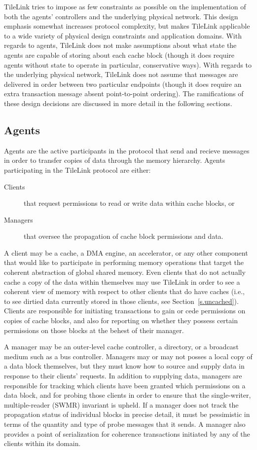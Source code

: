 TileLink tries to impose as few constraints as possible on the implementation of both the agents' controllers and the underlying physical network.
This design emphasis somewhat increases protocol complexity, but makes TileLink applicable to a wide variety of physical design constraints and application domains.
With regards to agents, TileLink does not make assumptions about what state the agents are capable of storing about each cache block
(though it does require agents without state to operate in particular, conservative ways).
With regards to the underlying physical network, TileLink does not assume that messages are delivered in order between two particular endpoints
(though it does require an extra transaction message absent point-to-point ordering).
The ramifications of these design decisions are discussed in more detail in the following sections.

\subsection{Agents}

Agents are the active participants in the protocol that send and recieve messages in order to transfer copies of data through the memory hierarchy.
Agents participating in the TileLink protocol are either:
\begin{description}
\item[Clients] that request permissions to read or write data within cache blocks, or
\item[Managers] that oversee the propagation of cache block permissions and data.
\end{description}

A client may be a cache, a DMA engine, an accelerator, or any other component that would like to participate in performing memory operations that target the coherent abstraction of global shared memory.
Even clients that do not actually cache a copy of the data within themselves may use TileLink in order to see a coherent view of memory with respect to other clients that do have caches
(i.e., to see dirtied data currently stored in those clients, see Section~\ref{s.uncached}).
Clients are responsible for initiating transactions to gain or cede permissions on copies of cache blocks, and also for reporting on whether they possess certain permissions on those blocks
at the behest of their manager.

A manager may be an outer-level cache controller, a directory, or a broadcast medium such as a bus controller.
Managers may or may not posses a local copy of a data block themselves, but they must know how to source and supply data in response to their clients' requests.
In addition to supplying data, managers are responsible for tracking which clients have been granted which permissions on a data block,
and for probing those clients in order to ensure that the 
single-writer, multiple-reader (SWMR) invariant \cite{sorin2011primer} is upheld.
If a manager does not track the propagation status of individual blocks in precise detail, it must be pessimistic
in terms of the quantity and type of probe messages that it sends.
A manager also provides a point of serialization for coherence transactions
initiated by any of the clients within its domain.

